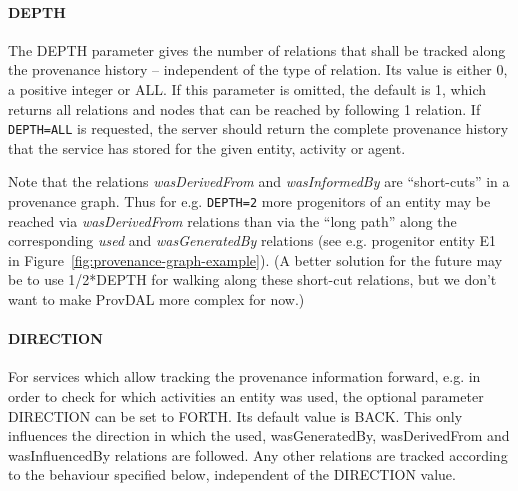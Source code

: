 \paragraph{{DEPTH}}
The DEPTH parameter gives the number of relations that shall be tracked along
the provenance history -- independent of the type of relation. Its value is
either 0, a positive integer or ALL. If this parameter is omitted,
the default is 1, which returns all relations and nodes that can be reached
by following 1 relation. If \texttt{DEPTH=ALL} is requested, the server should
return the complete provenance history that the service has stored for the
given entity, activity or agent.


Note that the relations \emph{wasDerivedFrom} and \emph{wasInformedBy} are ``short-cuts''
in a provenance graph. Thus for e.g. \texttt{DEPTH=2} more progenitors of an entity may
be reached via \emph{wasDerivedFrom} relations than via the ``long path'' along the
corresponding \emph{used} and \emph{wasGeneratedBy} relations (see e.g. progenitor entity E1 in
Figure~\ref{fig:provenance-graph-example}).
(A better solution for the future may be to use 1/2*DEPTH for walking along these short-cut relations, but we don't want to make ProvDAL more complex for now.)


\paragraph{DIRECTION}
For services which allow tracking the provenance information forward, e.g. in order to check for which activities an entity was used, the optional parameter DIRECTION can be set to FORTH. Its default value is BACK. This only influences the direction in which the used, wasGeneratedBy, wasDerivedFrom and wasInfluencedBy relations are followed. Any other relations are tracked according to the behaviour specified below, independent of the DIRECTION value.

